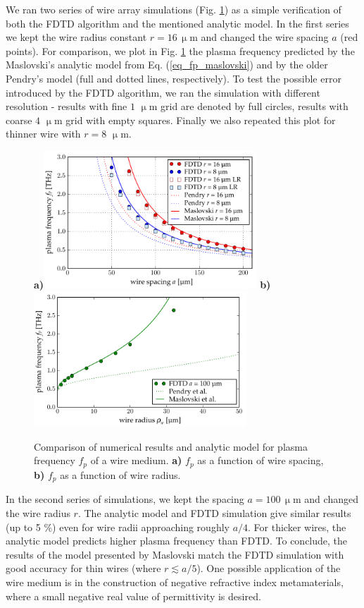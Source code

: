 \documentclass[letterpaper,12pt]{report}
\begin{document}
We ran two series of wire array simulations (Fig. \ref{fg_omegap_a}) as a simple verification of both the FDTD algorithm and the mentioned analytic model. In the first series we kept the wire radius constant $r = 16\,\upmu$m  and changed the wire spacing $a$ (red points). For comparison, we plot in Fig. \ref{fg_omegap_a} the plasma frequency predicted by the Maslovski's analytic model\cite{maslovski2002wire} from Eq. (\ref{eq_fp_maslovski}) and by the older Pendry's model \cite{pendry1996extremely} (full and dotted lines, respectively). To test the possible error introduced by the FDTD algorithm, we ran the simulation with different resolution - results with fine $1$ $\upmu$m grid are denoted by full circles, results with coarse $4$ $\upmu$m grid with empty squares. Finally we also repeated this plot for thinner wire with $r = 8$ $\upmu$m.
\begin{figure}[ht] \caption{Comparison of numerical results and analytic model for plasma frequency $f_p$ of a wire medium. \textbf{a)} $f_p$ as a function of wire spacing, \textbf{b)} $f_p$ as a function of wire radius. } \label{fg_omegap_a} \centering 
\textbf{a)}\includegraphics[width=8cm]{img/EWire_plasmaF_spacingscan.pdf}
\textbf{b)}\includegraphics[width=8cm]{img/EWire_plasmaF_radiusscan.pdf}
\end{figure}

In the second series of simulations, we kept the spacing $a = 100\,\upmu$m and changed the wire radius $r$. The analytic model\cite{maslovski2002wire} and FDTD simulation give similar results (up to 5 \%) even for wire radii approaching roughly $a/4$. For thicker wires, the analytic model predicts higher plasma frequency than FDTD.  To conclude, the results of the model presented by Maslovski match the FDTD simulation with good accuracy for thin wires (where $r \lesssim a/5$). One possible application of the wire medium is in the construction of negative refractive index metamaterials, where a small negative real value of permittivity is desired.
\end{document}
